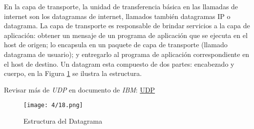   \begin{tcolorbox}
	[colback=green!5!white,colframe=green!75!black,fonttitle=\bfseries,title=  Datagrama]
En la capa de transporte, la unidad de transferencia básica en las llamadas de internet son los datagramas de internet, llamados también datagramas IP o \gls{datagrama}.
La capa de transporte es responsable de brindar servicios a la capa de aplicación: obtener un mensaje de un programa de aplicación que se ejecuta en el host de origen; lo encapsula en un paquete de capa de transporte (llamado datagrama de usuario);  y entregarlo al programa de aplicación correspondiente en el host de destino.
Un datagram esta compuesto de dos partes: encabezado y cuerpo, en la Figura \ref{fig:datagram} se ilustra la estructura.

Revisar m\'as de \textit{UDP} en documento de \textit{IBM}:  \href{https://www.ibm.com/docs/es/aix/7.1?topic=protocols-user-datagram-protocol}{UDP}
\end{tcolorbox}
	\begin{figure}  
		 \begin{center}
		\texttt{[image: 4/18.png]}
		\caption{Estructura del Datagrama}
		\label{fig:datagram}
	\end{center} 
 \end{figure} 


